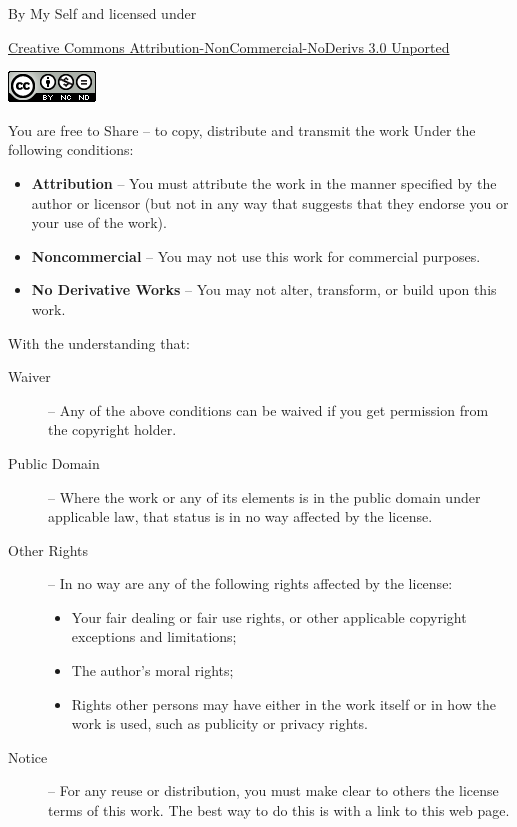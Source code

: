 \thispagestyle{empty}


\noindent By My Self and licensed under

\noindent
\href{http://creativecommons.org/licenses/by-nc-nd/3.0/}{Creative Commons Attribution-NonCommercial-NoDerivs 3.0 Unported}

\noindent
\href{http://creativecommons.org/licenses/by-nc-nd/3.0/}{\includegraphics{ch00_pics/creative-commons.png}}

\vfill

\noindent You are free to Share -- to copy, distribute and transmit the work
Under the following conditions:

\begin{itemize}
\item \textbf{Attribution} -- You must attribute the work in the manner
  specified by the author or licensor (but not in any way that
  suggests that they endorse you or your use of the work).
\item 
  \textbf{Noncommercial} -- You may not use this work for commercial purposes.
\item 
  \textbf{No Derivative Works} -- You may not alter, transform, or build upon
  this work.
\end{itemize}

\noindent With the understanding that:

\begin{description}
\item[Waiver] -- Any of the above conditions can be waived if you
  get permission from the copyright holder.  
\item[Public Domain] -- Where
  the work or any of its elements is in the public domain under
  applicable law, that status is in no way affected by the license.
\item[Other Rights] -- In no way are any of the following rights affected
  by the license: 
  \begin{itemize}
  \item Your fair dealing or fair use rights, or other applicable
    copyright exceptions and limitations;
  \item The author's moral rights;
  \item Rights other persons may have either in the work itself or in how
    the work is used, such as publicity or privacy rights.
  \end{itemize}
\item[Notice] -- For any reuse or distribution, you must make clear to
  others the license terms of this work. The best way to do this is
  with a link to this web page.
\end{description}




